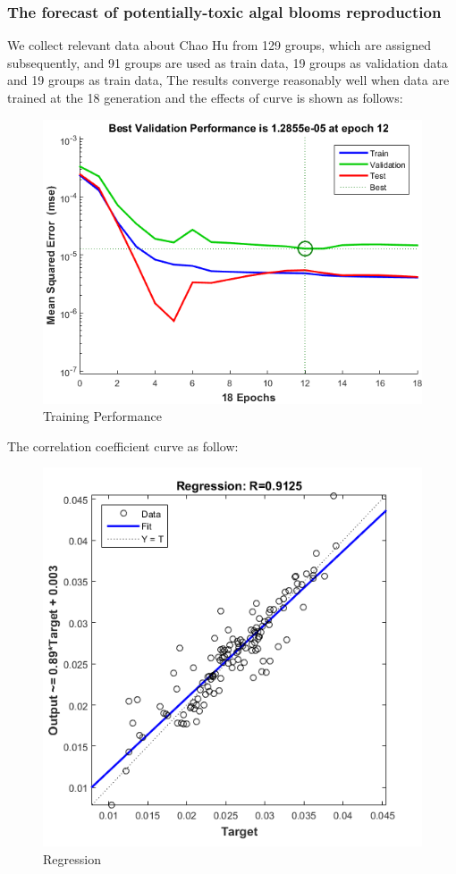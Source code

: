 \documentclass[12pt,a4paper]{article}
\begin{document}
\subsubsection{The forecast of potentially-toxic algal blooms reproduction}
We collect relevant data about Chao Hu from 129 groups, which are assigned subsequently, and 91 groups are used as train data, 19 groups as validation data and 19 groups as train data, The results converge reasonably well when data are trained at the 18 generation and the effects of curve is shown as follows:\\

\begin{figure}[H]
\centering
\includegraphics[width=0.7\linewidth]{"figure/TrainingPerformance"}
\caption{Training Performance}
\end{figure}

The correlation coefficient curve as follow:\\
\begin{figure}[H]
\centering
\includegraphics[width=0.7\linewidth]{figure/Regression}
\caption{Regression}
\end{figure}
\end{document}
